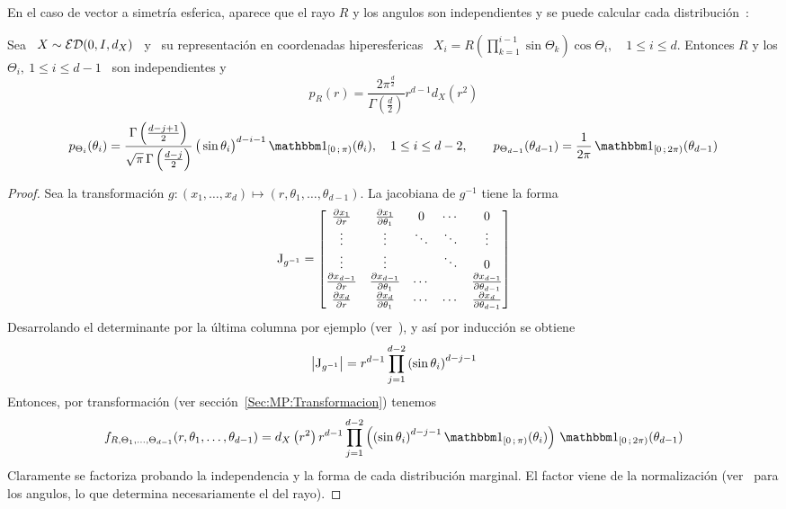 En  el caso  de vector  a simetr\'ia  esferica, aparece  que el  rayo $R$  y los
angulos     son     independientes      y     se     puede     calcular     cada
distribuci\'on~\cite{FanKot90, Lor54, Zoz, toto, titi}:
%
\begin{teorema}
  Sea  \  $X  \sim  \mathcal{ED}(0,I,d_X)$  \  y \  su  representaci\'on  en  coordenadas
  hiperesfericas \  $X_i = R \left( \prod_{k=1}^{i-1}  \sin\Theta_k \right) \cos
  \Theta_i, \quad 1 \le  i \le d$. Entonces $R$ y los $\Theta_i,  \: 1 \le i \le
  d-1$ \ son independientes y
  \[
  p_R(r) = \frac{2  \pi^{\frac{d}{2}}}{\Gamma\left( \frac{d}{2} \right)} r^{d-1}
  d_X\left( r^2 \right)
  \]
  \[
  p_{\Theta_i}(\theta_i)        =       \frac{\Gamma\left(       \frac{d-j+1}{2}
    \right)}{\sqrt{\pi}   \,  \Gamma\left(   \frac{d-j}{2}  \right)}   \,  \big(
  \sin\theta_i \big)^{d-i-1}  \, \un_{[0 \;  \pi)}(\theta_i), \quad 1 \le  i \le
  d-2 , \qquad p_{\Theta_{d-1}}(\theta_{d-1}) =  \frac{1}{2 \pi} \, \un_{[0 \; 2
    \pi)}(\theta_{d-1})
  \]
\end{teorema}
%
\begin{proof}
  Sea      la       transformaci\'on      $g:      (x_1,\ldots,x_d)      \mapsto
  (r,\theta_1,\ldots,\theta_{d-1})$. La jacobiana de $g^{-1}$ tiene la forma
  \[
  \operatorname{J}_{g^{-1}} = \begin{bmatrix}
    \frac{\partial x_1}{\partial r} & \frac{\partial x_1}{\partial \theta_1} & 0 & \cdots & 0\\
    \vdots & \vdots & \ddots & \ddots & \vdots\\
    \vdots & \vdots &  & \ddots  & 0\\
    \frac{\partial x_{d-1}}{\partial r} & \frac{\partial x_{d-1}}{\partial
    \theta_1} & \cdots & & \frac{\partial x_{d-1}}{\partial \theta_{d-1}}\\
    \frac{\partial x_d}{\partial  r} & \frac{\partial  x_d}{\partial \theta_1} &
    \cdots & \cdots & \frac{\partial x_d}{\partial \theta_{d-1}}
  \end{bmatrix}
  \]
  Desarrolando   el   determinante  por   la   \'ultima   columna  por   ejemplo
  (ver~\cite{Bha97, HorJoh13}), y as\'i por inducci\'on se obtiene
  \[
  \left|   \operatorname{J}_{g^{-1}}  \right|  =   r^{d-1}  \prod_{j=1}^{d-2}   \left(  \sin
    \theta_i\right)^{d-j-1}
  \]
  Entonces,  por  transformaci\'on  (ver  secci\'on~\ref{Sec:MP:Transformacion})
  tenemos
  \[
  f_{R,\Theta_1,\ldots,\Theta_{d-1}}(r,\theta_1,\ldots,\theta_{d-1}) = d_X\left(
    r^2    \right)     r^{d-1}    \prod_{j=1}^{d-2}    \left(     \left(    \sin
      \theta_i\right)^{d-j-1} \un_{[0 \; \pi)}(\theta_i) \right) \, \un_{[0 \; 2
    \pi)}(\theta_{d-1})
  \]
  Claramente  se  factoriza  probando  la  independencia  y  la  forma  de  cada
  distribuci\'on   marginal.    El   factor   viene    de   la   normalizaci\'on
  (ver~\cite[Ec.~8.380-2]{GraRyz15}   para  los   angulos,   lo  que   determina
  necesariamente el del rayo).
\end{proof}
